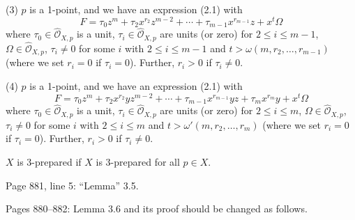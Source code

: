 \documentclass[11pt]{article}
\theoremstyle{plain}
\newcommand{\Oh}[1]{\widehat{\mathcal{O}}_{#1}}
\begin{document}


(3) $p$ is a 1-point, and we have an expression (2.1) with
\begin{equation}
F = \tau_0 z^m + \tau_2 x^{r_2} z^{m-2} + \cdots + \tau_{m-1} x^{r_{m-1}} z + x^t \Omega
\tag{3.7}
\end{equation}
where $\tau_0 \in \Oh{X,p}$ is a unit, $\tau_i \in \Oh{X,p}$ are units (or zero) for $2 \leqslant i \leqslant m-1$, $\Omega \in \Oh{X,p}$, $\tau_i \neq 0$ for some $i$ with $2 \leqslant i \leqslant m-1$ and $t > \omega(m, r_2, \ldots, r_{m-1})$ (where we set $r_i = 0$ if $\tau_i = 0$). Further, $r_i > 0$ if $\tau_i \neq 0$.

(4) $p$ is a 1-point, and we have an expression (2.1) with
\begin{equation}
F = \tau_0 z^m + \tau_2 x^{r_2} y z^{m-2} + \cdots + \tau_{m-1} x^{r_{m-1}} y z + \tau_m x^{r_m} y + x^t \Omega
\tag{A}
\end{equation}
where $\tau_0 \in \Oh{X,p}$ is a unit, $\tau_i \in \Oh{X,p}$ are units (or zero) for $2 \leqslant i \leqslant m$, $\Omega \in \Oh{X,p}$, $\tau_i \neq 0$ for some $i$ with $2 \leqslant i \leqslant m$ and $t > \omega'(m, r_2, \ldots, r_m)$ (where we set $r_i = 0$ if $\tau_i = 0$). Further, $r_i > 0$ if $\tau_i \neq 0$.

$X$ is 3-prepared if $X$ is 3-prepared for all $p \in X$.

Page 881, line 5: ``Lemma'' 3.5.

Pages 880--882: Lemma 3.6 and its proof should be changed as follows.

\end{document}
